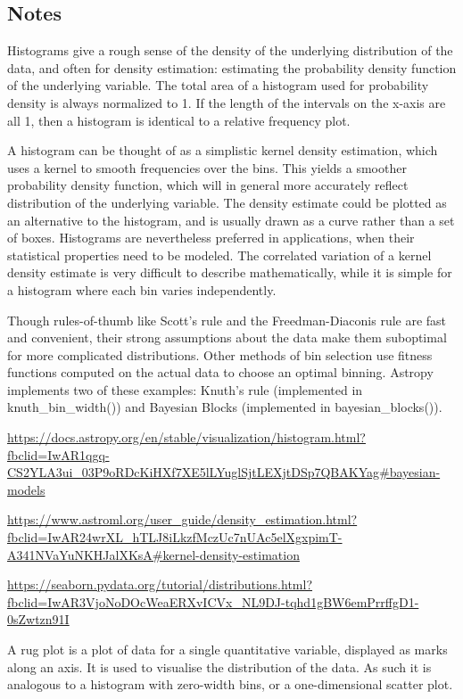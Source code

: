 \subsection*{Notes}

Histograms give a rough sense of the density of the underlying distribution of the data, and often for density estimation: estimating the probability density function of the underlying variable. The total area of a histogram used for probability density is always normalized to 1. If the length of the intervals on the x-axis are all 1, then a histogram is identical to a relative frequency plot.

A histogram can be thought of as a simplistic kernel density estimation, which uses a kernel to smooth frequencies over the bins. This yields a smoother probability density function, which will in general more accurately reflect distribution of the underlying variable. The density estimate could be plotted as an alternative to the histogram, and is usually drawn as a curve rather than a set of boxes. Histograms are nevertheless preferred in applications, when their statistical properties need to be modeled. The correlated variation of a kernel density estimate is very difficult to describe mathematically, while it is simple for a histogram where each bin varies independently. 

Though rules-of-thumb like Scott’s rule and the Freedman-Diaconis rule are fast and convenient, their strong assumptions about the data make them suboptimal for more complicated distributions. Other methods of bin selection use fitness functions computed on the actual data to choose an optimal binning. Astropy implements two of these examples: Knuth’s rule (implemented in knuth\_bin\_width()) and Bayesian Blocks (implemented in bayesian\_blocks()).

\url{https://docs.astropy.org/en/stable/visualization/histogram.html?fbclid=IwAR1qgq-CS2YLA3ui_03P9oRDcKiHXf7XE5lLYuglSjtLEXjtDSp7QBAKYag#bayesian-models}

\url{https://www.astroml.org/user_guide/density_estimation.html?fbclid=IwAR24wrXL_hTLJ8iLkzfMczUc7nUAc5elXgxpimT-A341NVaYuNKHJalXKsA#kernel-density-estimation}

\url{https://seaborn.pydata.org/tutorial/distributions.html?fbclid=IwAR3VjoNoDOcWeaERXvICVx_NL9DJ-tqhd1gBW6emPrrffgD1-0sZwtzn91I}


A rug plot is a plot of data for a single quantitative variable, displayed as marks along an axis. It is used to visualise the distribution of the data. As such it is analogous to a histogram with zero-width bins, or a one-dimensional scatter plot.

